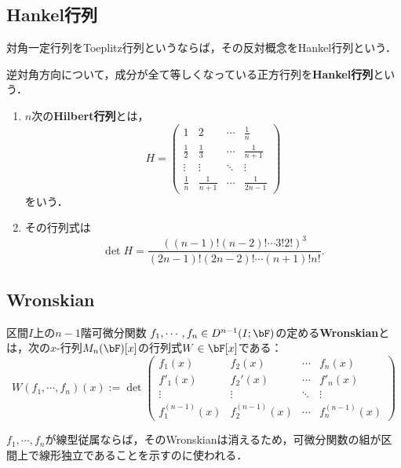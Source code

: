 \documentclass[uplatex, dvipdfmx]{jsreport}
\begin{document}
\subsection{Hankel行列}

\begin{tcolorbox}[colframe=ForestGreen, colback=ForestGreen!10!white,breakable,colbacktitle=ForestGreen!40!white,coltitle=black,fonttitle=\bfseries\sffamily,
title=]
    対角一定行列をToeplitz行列というならば，その反対概念をHankel行列という．
\end{tcolorbox}

\begin{definition}
    逆対角方向について，成分が全て等しくなっている正方行列を\textbf{Hankel行列}という．
\end{definition}

\begin{example}\mbox{}
    \begin{enumerate}
        \item $n$次の\textbf{Hilbert行列}とは，
        \[H=\begin{pmatrix}1&2&\cdots&\frac{1}{n}\\\frac{1}{2}&\frac{1}{3}&\cdots&\frac{1}{n+1}\\\vdots&\vdots&\ddots&\vdots\\\frac{1}{n}&\frac{1}{n+1}&\cdots&\frac{1}{2n-1}\end{pmatrix}\]
        をいう．
        \item その行列式は
        \[\det H=\frac{((n-1)!(n-2)!\cdots 3!2!)^3}{(2n-1)!(2n-2)!\cdots(n+1)!n!}.\]
    \end{enumerate}
\end{example}

\subsection{Wronskian}

\begin{definition}
    区間$I$上の$n-1$階可微分関数
    $f_1,\cdots,f_n\in D^{n-1}(I;\bF)$の定める\textbf{Wronskian}とは，次の$x$-行列$M_n(\bF)[x]$の行列式$W\in \bF[x]$である：
    \[W(f_1,\cdots,f_n)(x):=\det \begin{pmatrix}f_1(x)&f_2(x)&\cdots&f_n(x)\\f'_1(x)&f_2'(x)&\cdots&f'_n(x)\\\vdots&\vdots&\ddots&\vdots\\f_1^{(n-1)}(x)&f_2^{(n-1)}(x)&\cdots&f^{(n-1)}_n(x)\end{pmatrix}\]
\end{definition}
\begin{remarks}
    $f_1,\cdots,f_n$が線型従属ならば，そのWronskianは消えるため，可微分関数の組が区間上で線形独立であることを示すのに使われる．
\end{remarks}
\end{document}
